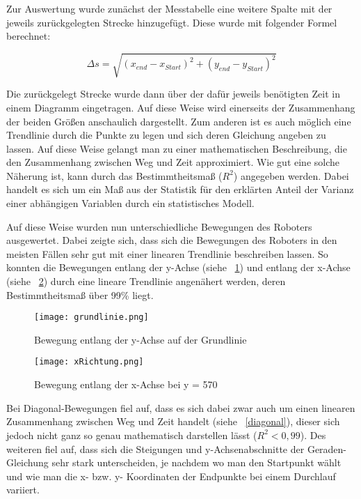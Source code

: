 Zur Auswertung wurde zunächst der Messtabelle eine weitere Spalte mit der jeweils zurückgelegten Strecke hinzugefügt. Diese wurde mit folgender Formel berechnet: 

\begin{equation}
\Delta s=\sqrt{(x_{end}-x_{Start})^{2}+(y_{end}-y_{Start})^{2}}
\end{equation} 

Die zurückgelegt Strecke wurde dann über der dafür jeweils benötigten Zeit in einem Diagramm eingetragen. Auf diese Weise wird  einerseits der Zusammenhang der beiden Größen anschaulich dargestellt. Zum anderen ist es auch möglich eine Trendlinie durch die Punkte zu legen und sich deren Gleichung angeben zu lassen. Auf diese Weise gelangt man zu einer mathematischen Beschreibung, die den Zusammenhang zwischen Weg und Zeit approximiert. Wie gut eine solche Näherung ist, kann durch das Bestimmtheitsmaß ($ R^2 $) angegeben werden. Dabei handelt es sich um ein Maß aus der Statistik für den erklärten Anteil der Varianz einer abhängigen Variablen durch ein statistisches Modell. \cite{wiki:2016}

Auf diese Weise wurden nun unterschiedliche Bewegungen des Roboters ausgewertet. Dabei zeigte sich, dass sich die Bewegungen des Roboters in den meisten Fällen sehr gut mit einer linearen Trendlinie beschreiben lassen. So konnten die Bewegungen entlang der y-Achse (siehe ~\ref{yAchse}) und entlang der x-Achse (siehe ~\ref{xAchse}) durch eine lineare Trendlinie angenähert werden, deren Bestimmtheitsmaß über 99\% liegt. 

\begin{figure}[htbp]
\centering
\texttt{[image: grundlinie.png]}
\caption{Bewegung entlang der y-Achse auf der Grundlinie} 
\label{yAchse}
\end{figure}      

\begin{figure}[htbp]
\centering
\texttt{[image: xRichtung.png]}
\caption{Bewegung entlang der x-Achse bei y = 570} 
\label{xAchse}
\end{figure} 

Bei Diagonal-Bewegungen fiel auf, dass es sich dabei zwar auch um einen linearen Zusammenhang zwischen Weg und Zeit handelt (siehe ~\ref{diagonal}), dieser sich jedoch nicht ganz so genau mathematisch darstellen lässt ($ R^2 < 0,99 $). Des weiteren fiel auf, dass sich die Steigungen und y-Achsenabschnitte der Geraden-Gleichung sehr stark unterscheiden, je nachdem wo man den Startpunkt wählt und wie man die x- bzw. y- Koordinaten der Endpunkte bei einem Durchlauf variiert. 


